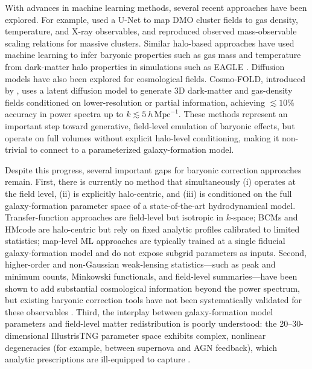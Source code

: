 \documentclass[linenumbers,trackchanges, twocolumn]{aastex701}
\begin{document}
With advances in machine learning methods, several recent approaches have been explored. For example, \citet{Chadayammuri2023} used a U-Net to map DMO cluster fields to gas density, temperature, and X-ray observables, and reproduced observed mass-observable scaling relations for massive clusters. Similar halo-based approaches have used machine learning to infer baryonic properties such as gas mass and temperature from dark-matter halo properties in simulations such as EAGLE \citep[e.g.][]{Truong2021}. Diffusion models have also been explored for cosmological fields. Cosmo-FOLD, introduced by \citet{Mishra2026}, uses a latent diffusion model to generate 3D dark-matter and gas-density fields conditioned on lower-resolution or partial information, achieving $\lesssim 10\%$ accuracy in power spectra up to $k \lesssim 5~h\,\mathrm{Mpc}^{-1}$. These methods represent an important step toward generative, field-level emulation of baryonic effects, but operate on full volumes without explicit halo-level conditioning, making it non-trivial to connect to a parameterized galaxy-formation model. 

Despite this progress, several important gaps for baryonic correction approaches remain. First, there is currently no method that simultaneously (i) operates at the field level, (ii) is explicitly halo-centric, and (iii) is conditioned on the full galaxy-formation parameter space of a state-of-the-art hydrodynamical model. Transfer-function approaches are field-level but isotropic in $k$-space; BCMs and HMcode are halo-centric but rely on fixed analytic profiles calibrated to limited statistics; map-level ML approaches are typically trained at a single fiducial galaxy-formation model and do not expose subgrid parameters as inputs. Second, higher-order and non-Gaussian weak-lensing statistics---such as peak and minimum counts, Minkowski functionals, and field-level summaries---have been shown to add substantial cosmological information beyond the power spectrum, but existing baryonic correction tools have not been systematically validated for these observables \citep{Lee2023,Lee2026}. Third, the interplay between galaxy-formation model parameters and field-level matter redistribution is poorly understood: the 20–30-dimensional IllustrisTNG parameter space exhibits complex, nonlinear degeneracies (for example, between supernova and AGN feedback), which analytic prescriptions are ill-equipped to capture \citep{Lee2024}.
\end{document}
